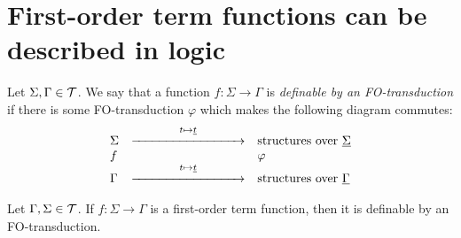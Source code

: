 
\section{First-order term functions can be described in logic}
\label{sec:to-logic}


\begin{definition} Let $\Sigma, \Gamma\in {\mathcal T}$. We say that a function $f:\Sigma\to \Gamma$ is \emph{definable by an FO-transduction} if there is some FO-transduction $\varphi$ which makes the following diagram commutes:
    \[\begin{array}{lll}
    \Sigma& \stackrel{t\mapsto \underline{t}}{\xrightarrow{\hspace*{3cm}}} & \text{structures over }\underline \Sigma \\
    f&&\varphi\\
    \Gamma& \stackrel{t\mapsto \underline{t}}{\xrightarrow{\hspace*{3cm}}}  & \text{structures over }\underline \Gamma 
    \end{array}\]
    \end{definition}
    
    \begin{proposition}
    Let $\Gamma, \Sigma \in {\mathcal T}$. If $f:\Sigma\to\Gamma$ is a first-order term function, then it is definable by an FO-transduction. 
    \end{proposition}
    

